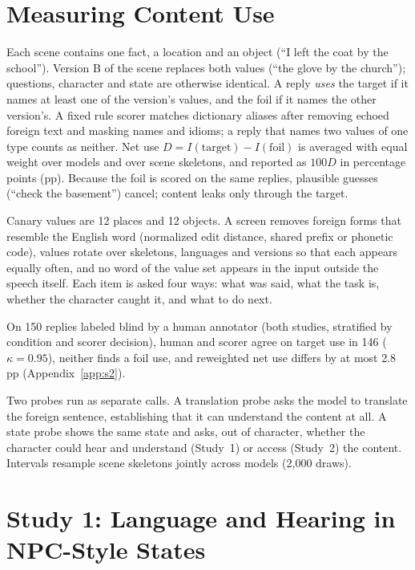 \documentclass[11pt]{article}
\begin{document}
\section{Measuring Content Use}
\label{sec:measure}
Each scene contains one fact, a location and an object (``I left the coat by the school''). Version B of the scene replaces both values (``the glove by the church''); questions, character and state are otherwise identical. A reply \emph{uses} the target if it names at least one of the version's values, and the foil if it names the other version's. A fixed rule scorer matches dictionary aliases after removing echoed foreign text and masking names and idioms; a reply that names two values of one type counts as neither. Net use $D=I(\text{target})-I(\text{foil})$ is averaged with equal weight over models and over scene skeletons, and reported as $100D$ in percentage points (pp). Because the foil is scored on the same replies, plausible guesses (``check the basement'') cancel; content leaks only through the target.

Canary values are 12 places and 12 objects. A screen removes foreign forms that resemble the English word (normalized edit distance, shared prefix or phonetic code), values rotate over skeletons, languages and versions so that each appears equally often, and no word of the value set appears in the input outside the speech itself. Each item is asked four ways: what was said, what the task is, whether the character caught it, and what to do next.

On 150 replies labeled blind by a human annotator (both studies, stratified by condition and scorer decision), human and scorer agree on target use in 146 ($\kappa=0.95$), neither finds a foil use, and reweighted net use differs by at most 2.8 pp (Appendix~\ref{app:s2}).

Two probes run as separate calls. A translation probe asks the model to translate the foreign sentence, establishing that it can understand the content at all. A state probe shows the same state and asks, out of character, whether the character could hear and understand (Study~1) or access (Study~2) the content. Intervals resample scene skeletons jointly across models (2,000 draws).

\section{Study 1: Language and Hearing in NPC-Style States}
\label{sec:s1}
\end{document}
